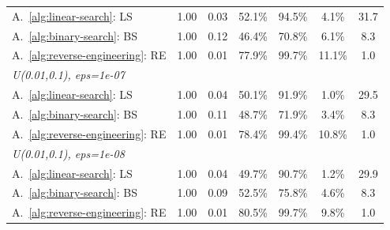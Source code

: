 \begin{table}[ht]
\begin{tabular}{lcccccc}
A.~\ref{alg:linear-search}: LS
& 1.00
& 0.03
& 52.1\%
& 94.5\%
& 4.1\%
& 31.7 \\
A.~\ref{alg:binary-search}: BS
& 1.00
& 0.12
& 46.4\%
& 70.8\%
& 6.1\%
& 8.3 \\
A.~\ref{alg:reverse-engineering}: RE
& 1.00
& 0.01
& 77.9\%
& 99.7\%
& 11.1\%
& 1.0 \\
\midrule
\multicolumn{7}{l}{\itshape U(0.01,0.1), eps=1e-07} \\
A.~\ref{alg:linear-search}: LS
& 1.00
& 0.04
& 50.1\%
& 91.9\%
& 1.0\%
& 29.5 \\
A.~\ref{alg:binary-search}: BS
& 1.00
& 0.11
& 48.7\%
& 71.9\%
& 3.4\%
& 8.3 \\
A.~\ref{alg:reverse-engineering}: RE
& 1.00
& 0.01
& 78.4\%
& 99.4\%
& 10.8\%
& 1.0 \\
\midrule
\multicolumn{7}{l}{\itshape U(0.01,0.1), eps=1e-08} \\
A.~\ref{alg:linear-search}: LS
& 1.00
& 0.04
& 49.7\%
& 90.7\%
& 1.2\%
& 29.9 \\
A.~\ref{alg:binary-search}: BS
& 1.00
& 0.09
& 52.5\%
& 75.8\%
& 4.6\%
& 8.3 \\
A.~\ref{alg:reverse-engineering}: RE
& 1.00
& 0.01
& 80.5\%
& 99.7\%
& 9.8\%
& 1.0 \\
\bottomrule
\end{tabular}
\end{table}

